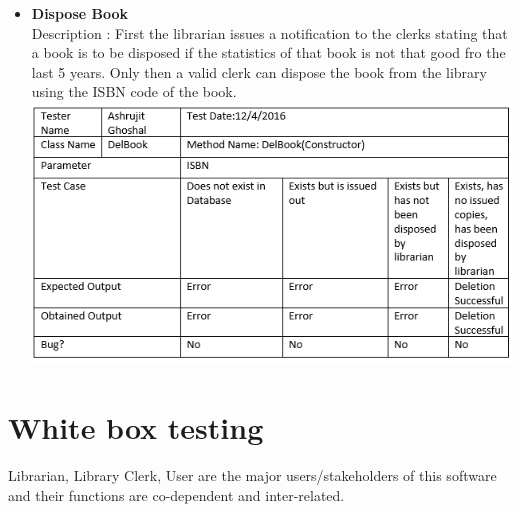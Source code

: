 \documentclass{article}
\begin{document}
\begin{itemize}
	\item \textbf{Dispose Book} \\
	Description : First the librarian issues a notification to the clerks stating that a book is to be disposed if the statistics of that book is not that good fro the last 5 years.
	Only then a valid clerk can dispose the book from the library using the ISBN code of the book.\\
	\includegraphics[scale=0.8]{images/Tables/DelBook.PNG}
	
	
	
	
\end{itemize}

\section{White box testing}
Librarian, Library Clerk, User are the major users/stakeholders of this software and their functions are co-dependent and inter-related. 
\end{document}
